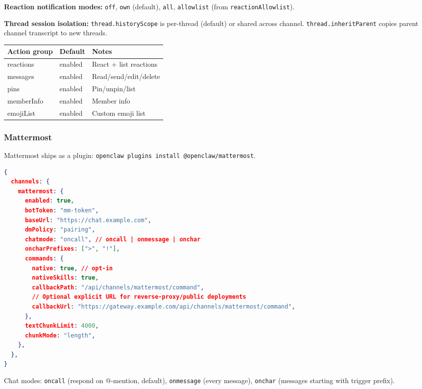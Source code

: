\textbf{Reaction notification modes:} \texttt{off}, \texttt{own} (default), \texttt{all}, \texttt{allowlist} (from \texttt{reactionAllowlist}).

\textbf{Thread session isolation:} \texttt{thread.historyScope} is per-thread (default) or shared across channel. \texttt{thread.inheritParent} copies parent channel transcript to new threads.


\begin{table}[h]
\centering
\small
\begin{tabular}{|l|l|l|}
\hline
Action group & Default & Notes \\
\hline
reactions & enabled & React + list reactions \\
\hline
messages & enabled & Read/send/edit/delete \\
\hline
pins & enabled & Pin/unpin/list \\
\hline
memberInfo & enabled & Member info \\
\hline
emojiList & enabled & Custom emoji list \\
\hline
\end{tabular}
\end{table}



\subsubsection{Mattermost}


Mattermost ships as a plugin: \texttt{openclaw plugins install @openclaw/mattermost}.

\begin{lstlisting}[language=json]
{
  channels: {
    mattermost: {
      enabled: true,
      botToken: "mm-token",
      baseUrl: "https://chat.example.com",
      dmPolicy: "pairing",
      chatmode: "oncall", // oncall | onmessage | onchar
      oncharPrefixes: [">", "!"],
      commands: {
        native: true, // opt-in
        nativeSkills: true,
        callbackPath: "/api/channels/mattermost/command",
        // Optional explicit URL for reverse-proxy/public deployments
        callbackUrl: "https://gateway.example.com/api/channels/mattermost/command",
      },
      textChunkLimit: 4000,
      chunkMode: "length",
    },
  },
}
\end{lstlisting}


Chat modes: \texttt{oncall} (respond on @-mention, default), \texttt{onmessage} (every message), \texttt{onchar} (messages starting with trigger prefix).

